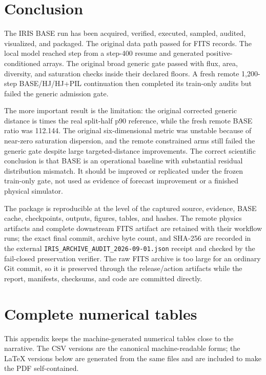 \documentclass[11pt,oneside]{report}
\begin{document}
\chapter{Conclusion}

The IRIS BASE run has been acquired, verified, executed, sampled, audited, visualized, and packaged. The original data path passed for \AcquiredCount{} FITS records. The local model reached step \BaseSteps{} from a step-400 resume and generated \SyntheticCount{} positive-conditioned arrays. The original broad generic gate passed with flux, area, diversity, and saturation checks inside their declared floors. A fresh remote 1,200-step BASE/HJ/HJ+PIL continuation then completed its train-only audits but failed the generic admission gate.

The more important result is the limitation: the original corrected generic distance is \AuditDistanceRatio{} times the real split-half p90 reference, while the fresh remote BASE ratio was 112.144. The original six-dimensional metric was unstable because of near-zero saturation dispersion, and the remote constrained arms still failed the generic gate despite large targeted-distance improvements. The correct scientific conclusion is that BASE is an operational baseline with substantial residual distribution mismatch. It should be improved or replicated under the frozen train-only gate, not used as evidence of forecast improvement or a finished physical simulator.

The package is reproducible at the level of the captured source, evidence, BASE cache, checkpoints, outputs, figures, tables, and hashes. The remote physics artifacts and complete downstream FITS artifact are retained with their workflow runs; the exact final commit, archive byte count, and SHA-256 are recorded in the external \texttt{IRIS\_ARCHIVE\_AUDIT\_2026-09-01.json} receipt and checked by the fail-closed preservation verifier. The raw FITS archive is too large for an ordinary Git commit, so it is preserved through the release/action artifacts while the report, manifests, checksums, and code are committed directly.

\appendix
\chapter{Complete numerical tables}

This appendix keeps the machine-generated numerical tables close to the narrative. The CSV versions are the canonical machine-readable forms; the LaTeX versions below are generated from the same files and are included to make the PDF self-contained.
\end{document}

